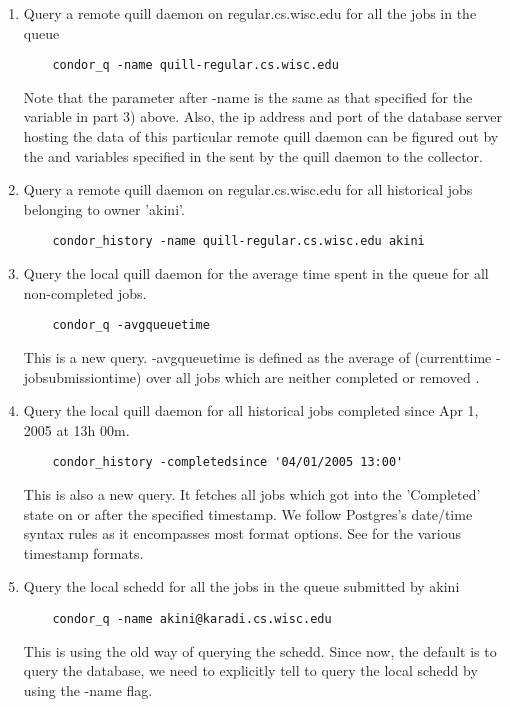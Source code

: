 \begin{enumerate}
\item Query a remote quill daemon on regular.cs.wisc.edu for all the jobs in 
the queue
\begin{verbatim}
	condor_q -name quill-regular.cs.wisc.edu
\end{verbatim}
Note that the parameter after -name is the same as that specified for the
 variable in part 3) above.  Also, the ip address
and port of the database server hosting the data of this particular remote
quill daemon can be figured out by the  and
 variables specified in the 
sent by the quill daemon to the collector.


\item Query a remote quill daemon on regular.cs.wisc.edu for all historical 
jobs belonging to owner 'akini'.
\begin{verbatim}
	condor_history -name quill-regular.cs.wisc.edu akini
\end{verbatim}

\item Query the local quill daemon for the average time spent in the queue 
for all non-completed jobs. 
\begin{verbatim}
	condor_q -avgqueuetime 
\end{verbatim}
This is a new query.  -avgqueuetime is defined as the average of
(currenttime - jobsubmissiontime) over all jobs which are neither
completed  or removed .

\item Query the local quill daemon for all historical jobs completed since 
Apr 1, 2005 at 13h 00m.
\begin{verbatim}
	condor_history -completedsince '04/01/2005 13:00'
\end{verbatim}
This is also a new query.  It fetches all jobs
which got into the 'Completed' state on or after the
specified timestamp.  We follow Postgres's date/time
syntax rules as it encompasses most format options.  See
for the various timestamp formats.

\item Query the local schedd for all the jobs in the queue submitted by akini
\begin{verbatim}
	condor_q -name akini@karadi.cs.wisc.edu
\end{verbatim}
This is using the old way of querying the schedd.  Since now, the default
is to query the database, we need to explicitly tell  to query
the local schedd by using the -name flag.

\end{enumerate}

